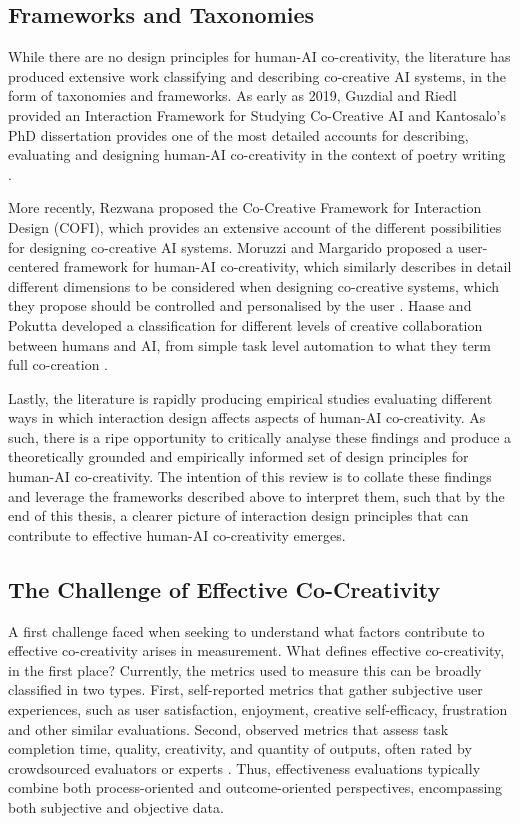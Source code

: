 \subsection{Frameworks and Taxonomies}

While there are no design principles for human-AI co-creativity, the literature has produced extensive work classifying and describing co-creative AI systems, in the form of taxonomies and frameworks. As early as 2019, Guzdial and Riedl provided an Interaction Framework for Studying Co-Creative AI \cite{Guzdial2019-gr} and Kantosalo's PhD dissertation provides one of the most detailed accounts for describing, evaluating and designing human-AI co-creativity in the context of poetry writing \cite{Kantosalo2019-pz}. 

More recently, Rezwana \cite{Rezwana2022-gg} proposed the Co-Creative Framework for Interaction Design (COFI), which provides an extensive account of the different possibilities for designing co-creative AI systems. Moruzzi and Margarido proposed a user-centered framework for human-AI co-creativity, which similarly describes in detail different dimensions to be considered when designing co-creative systems, which they propose should be controlled and personalised by the user \cite{Moruzzi2024-cq}. Haase and Pokutta developed a classification for different levels of creative collaboration between humans and AI, from simple task level automation to what they term full co-creation \cite{Haase2024-yp}. 

Lastly, the literature is rapidly producing empirical studies evaluating different ways in which interaction design affects aspects of human-AI co-creativity. As such, there is a ripe opportunity to critically analyse these findings and produce a theoretically grounded and empirically informed set of design principles for human-AI co-creativity. The intention of this review is to collate these findings and leverage the frameworks described above to interpret them, such that by the end of this thesis, a clearer picture of interaction design principles that can contribute to effective human-AI co-creativity emerges. 

\subsection{The Challenge of Effective Co-Creativity}

A first challenge faced when seeking to understand what factors contribute to effective co-creativity arises in measurement. What defines effective co-creativity, in the first place? Currently, the metrics used to measure this can be broadly classified in two types. First, self-reported metrics that gather subjective user experiences, such as user satisfaction, enjoyment, creative self-efficacy, frustration and other similar evaluations. Second, observed metrics that assess task completion time, quality, creativity, and quantity of outputs, often rated by crowdsourced evaluators or experts \cite{Kim2021-fh, Kantosalo2019-pz, Rezwana2022-ui, Rezwana2023-gj, Lawton2023-tb}. Thus, effectiveness evaluations typically combine both process-oriented and outcome-oriented perspectives, encompassing both subjective and objective data.

